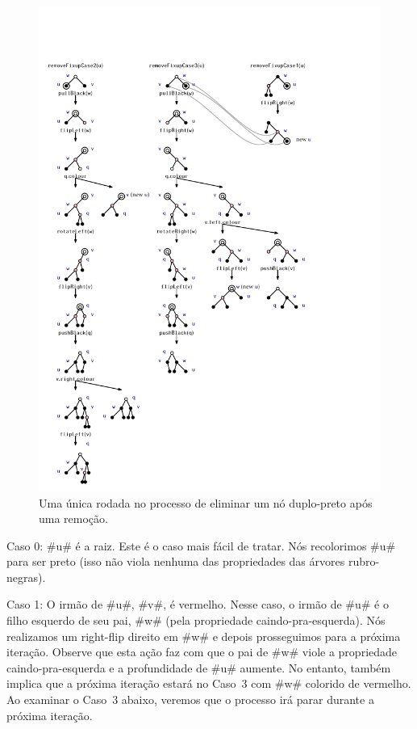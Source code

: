 \begin{figure}
	\begin{center}
		\includegraphics[height=\HeightScaleIfNeeded]{figs/rb-removefix}
	\end{center}
	\caption{Uma única rodada no processo de eliminar um nó duplo-preto
		após uma remoção.}
\end{figure}

\noindent
Caso 0: #u# é a raiz. Este é o caso mais fácil de tratar. Nós recolorimos
#u# para ser preto (isso não viola nenhuma das propriedades das 
árvores rubro-negras).

\noindent 
Caso 1: O irmão de #u#, #v#, é vermelho. Nesse caso, o irmão de #u# é o
filho esquerdo de seu pai, #w# (pela propriedade caindo-pra-esquerda). Nós realizamos
um right-flip direito em #w# e depois prosseguimos para a próxima iteração. Observe que
esta ação faz com que o pai de #w# viole a propriedade caindo-pra-esquerda e
a profundidade de #u# aumente. No entanto, também implica que a próxima
iteração estará no Caso~3 com #w# colorido de vermelho. Ao examinar o
Caso~3 abaixo, veremos que o processo irá parar durante a próxima iteração.

